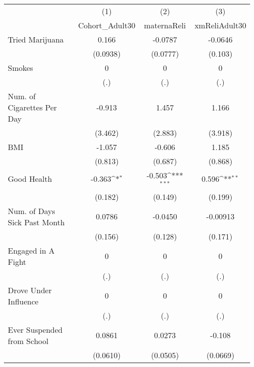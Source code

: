 {
\def\sym#1{\ifmmode^{#1}\else\(^{#1}\)\fi}
\begin{tabular}{l*{3}{c}}
\hline\hline
            &\multicolumn{1}{c}{(1)}&\multicolumn{1}{c}{(2)}&\multicolumn{1}{c}{(3)}\\
            &\multicolumn{1}{c}{Cohort\_Adult30}&\multicolumn{1}{c}{maternaReli}&\multicolumn{1}{c}{xmReliAdult30}\\
\hline
Tried Marijuana&       0.166         &     -0.0787         &     -0.0646         \\
            &    (0.0938)         &    (0.0777)         &     (0.103)         \\
[1em]
Smokes      &           0         &           0         &           0         \\
            &         (.)         &         (.)         &         (.)         \\
[1em]
Num. of Cigarettes Per Day&      -0.913         &       1.457         &       1.166         \\
            &     (3.462)         &     (2.883)         &     (3.918)         \\
[1em]
BMI         &      -1.057         &      -0.606         &       1.185         \\
            &     (0.813)         &     (0.687)         &     (0.868)         \\
[1em]
Good Health &      -0.363\sym{*}  &      -0.503\sym{***}&       0.596\sym{**} \\
            &     (0.182)         &     (0.149)         &     (0.199)         \\
[1em]
Num. of Days Sick Past Month&      0.0786         &     -0.0450         &    -0.00913         \\
            &     (0.156)         &     (0.128)         &     (0.171)         \\
[1em]
Engaged in A Fight&           0         &           0         &           0         \\
            &         (.)         &         (.)         &         (.)         \\
[1em]
Drove Under Influence&           0         &           0         &           0         \\
            &         (.)         &         (.)         &         (.)         \\
[1em]
Ever Suspended from School&      0.0861         &      0.0273         &      -0.108         \\
            &    (0.0610)         &    (0.0505)         &    (0.0669)         \\

\end{tabular}}
